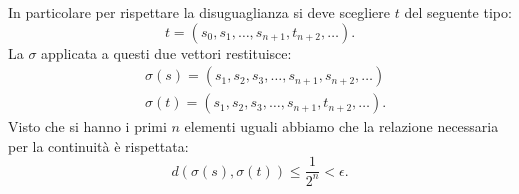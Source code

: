 In particolare per rispettare la disuguaglianza si deve scegliere $t$ del seguente tipo:
\[
    t = (s_0, s_1, \ldots , s_{n+1}, t_{n+2}, \ldots) 
.\] 
La $\sigma$ applicata a questi due vettori restituisce:
\[\begin{aligned}
    & \sigma (s)=(s_1,s_2,s_3, \ldots, s_{n+1}, s_{n+2}, \ldots)  \\
    & \sigma(t) = (s_1,s_2,s_3,\ldots,s_{n+1}, t_{n+2}, \ldots) 
.\end{aligned}\]
Visto che si hanno i primi $n$ elementi uguali abbiamo che la relazione necessaria per la continuità è rispettata:
\[
    d(\sigma (s) , \sigma (t) ) \le \frac{1}{2^n}<\epsilon
.\] 
